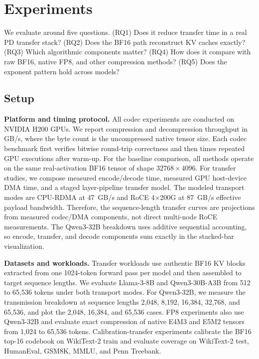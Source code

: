 \section{Experiments}
\label{sec:experiments}

We evaluate \splitzip around five questions. (RQ1) Does it reduce transfer time in a real PD transfer stack? (RQ2) Does the BF16 path reconstruct KV caches exactly? (RQ3) Which algorithmic components matter? (RQ4) How does it compare with raw BF16, native FP8, and other compression methods? (RQ5) Does the exponent pattern hold across models?

\subsection{Setup}

\textbf{Platform and timing protocol.}
All codec experiments are conducted on NVIDIA H200 GPUs. We report compression and decompression throughput in GB/s, where the byte count is the uncompressed native tensor size. Each codec benchmark first verifies bitwise round-trip correctness and then times repeated GPU executions after warm-up. For the baseline comparison, all methods operate on the same real-activation BF16 tensor of shape $32768 \times 4096$. For transfer studies, we compose measured \splitzip encode/decode time, measured GPU host-device DMA time, and a staged layer-pipeline transfer model. The modeled transport modes are CPU-RDMA at 47~GB/s and RoCE 4$\times$200G at 87~GB/s effective payload bandwidth. Therefore, the sequence-length transfer curves are projections from measured codec/DMA components, not direct multi-node RoCE measurements. The Qwen3-32B breakdown uses additive sequential accounting, so encode, transfer, and decode components sum exactly in the stacked-bar visualization.

\textbf{Datasets and workloads.}
Transfer workloads use authentic BF16 KV blocks extracted from one 1024-token forward pass per model and then assembled to target sequence lengths. We evaluate Llama-3-8B and Qwen3-30B-A3B from 512 to 65,536 tokens under both transport modes. For Qwen3-32B, we measure the transmission breakdown at sequence lengths 2,048, 8,192, 16,384, 32,768, and 65,536, and plot the 2,048, 16,384, and 65,536 cases. FP8 experiments also use Qwen3-32B and evaluate exact compression of native E4M3 and E5M2 tensors from 1,024 to 65,536 tokens. Calibration-transfer experiments calibrate the BF16 top-16 codebook on WikiText-2 train and evaluate coverage on WikiText-2 test, HumanEval, GSM8K, MMLU, and Penn Treebank.

